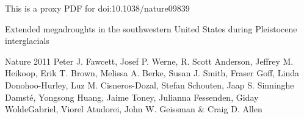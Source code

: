 \documentclass[letterpaper]{article}
\begin{document}
 
This is a proxy PDF for doi:10.1038/nature09839

Extended megadroughts in the southwestern United States during Pleistocene interglacials

Nature 2011
Peter J. Fawcett,	 Josef P. Werne,	 R. Scott Anderson,	 Jeffrey M. Heikoop,
Erik T. Brown, Melissa A. Berke,	 Susan J. Smith,	 Fraser Goff,	 Linda
Donohoo-Hurley,	 Luz M. Cisneros-Dozal,	 Stefan Schouten,	 Jaap S. Sinninghe
Damsté,	 Yongsong Huang,	 Jaime Toney, Julianna Fessenden,	 Giday
WoldeGabriel,	 Viorel Atudorei,	 John W. Geissman	 \& Craig D. Allen
\end{document}
